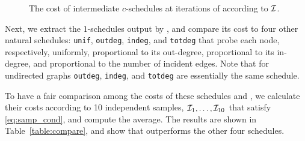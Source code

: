 \begin{figure}[htbp]
\caption{\scriptsize The cost of intermediate $c$-schedules at iterations of \algonameapx  according to $\mathcal{I}$.}\label{fig:conv}
\end{figure}







Next, we extract the $1$-schedules  output by \algonameapx, and compare its cost to four other natural schedules: \texttt{unif}, \texttt{outdeg}, \texttt{indeg}, and \texttt{totdeg} that probe each node, respectively, uniformly, proportional to its out-degree, proportional to its in-degree, and proportional to the number of incident edges. Note that for undirected graphs \texttt{outdeg}, \texttt{indeg}, and \texttt{totdeg} are essentially the same schedule.

To have a fair comparison among the costs of these schedules and \algonameapx, we calculate their costs according to 10  independent samples, $\mathcal{I}_1,\ldots,\mathcal{I}_{10}$ that satisfy \eqref{eq:samp_cond}, and compute the average. The results are shown in Table~\ref{table:compare}, and show that \algonameapx outperforms the other four schedules.



